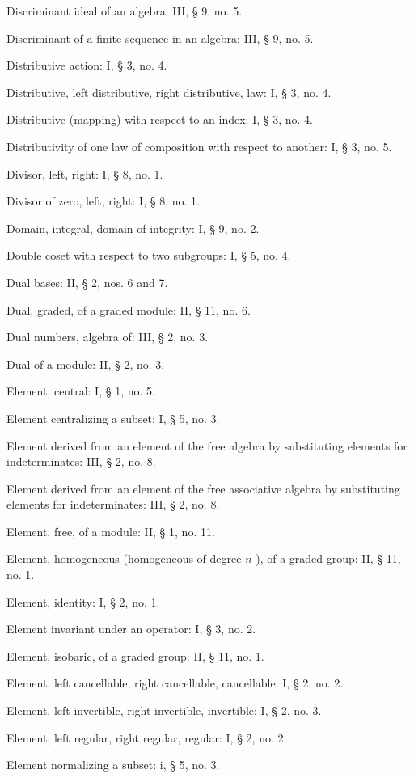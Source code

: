Discriminant ideal of an algebra: III, § 9, no. 5.

Discriminant of a finite sequence in an algebra: III, § 9, no. 5.

Distributive action: I, § 3, no. 4.

Distributive, left distributive, right distributive, law: I, § 3, no. 4.

Distributive (mapping) with respect to an index: I, § 3, no. 4.

Distributivity of one law of composition with respect to another: I, § 3, no. 5.

Divisor, left, right: I, § 8, no. 1.

Divisor of zero, left, right: I, § 8, no. 1.

Domain, integral, domain of integrity: I, § 9, no. 2.

Double coset with respect to two subgroups: I, § 5, no. 4.

Dual bases: II, § 2, nos. 6 and 7.

Dual, graded, of a graded module: II, § 11, no. 6.

Dual numbers, algebra of: III, § 2, no. 3.

Dual of a module: II, § 2, no. 3.

Element, central: I, § 1, no. 5.

Element centralizing a subset: I, § 5, no. 3.

Element derived from an element of the free algebra by substituting elements for indeterminates: III, § 2, no. 8.

Element derived from an element of the free associative algebra by substituting elements for indeterminates: III, § 2, no. 8.

Element, free, of a module: II, § 1, no. 11.

Element, homogeneous (homogeneous of degree \(n\) ), of a graded group: II, § 11, no. 1.

Element, identity: I, § 2, no. 1.

Element invariant under an operator: I, § 3, no. 2.

Element, isobaric, of a graded group: II, § 11, no. 1.

Element, left cancellable, right cancellable, cancellable: I, § 2, no. 2.

Element, left invertible, right invertible, invertible: I, § 2, no. 3.

Element, left regular, right regular, regular: I, § 2, no. 2.

Element normalizing a subset: i, § 5, no. 3.

